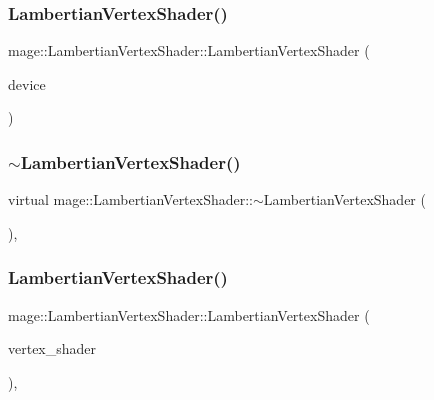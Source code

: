 \subsubsection{\texorpdfstring{Lambertian\+Vertex\+Shader()}{LambertianVertexShader()}\hspace{0.1cm}{\footnotesize\ttfamily [1/3]}}
{\footnotesize\ttfamily mage\+::\+Lambertian\+Vertex\+Shader\+::\+Lambertian\+Vertex\+Shader (\begin{DoxyParamCaption}\item[{I\+D3\+D11\+Device2 \&}]{device }\end{DoxyParamCaption})}

\hypertarget{classmage_1_1_lambertian_vertex_shader_a55636fd3817b97b6529690d6e3e5cd46}{}\label{classmage_1_1_lambertian_vertex_shader_a55636fd3817b97b6529690d6e3e5cd46} 
\subsubsection{\texorpdfstring{$\sim$\+Lambertian\+Vertex\+Shader()}{~LambertianVertexShader()}}
{\footnotesize\ttfamily virtual mage\+::\+Lambertian\+Vertex\+Shader\+::$\sim$\+Lambertian\+Vertex\+Shader (\begin{DoxyParamCaption}{ }\end{DoxyParamCaption})\hspace{0.3cm}{\ttfamily [virtual]}, {\ttfamily [default]}}

\hypertarget{classmage_1_1_lambertian_vertex_shader_add164d66906e307d95232b2c41567a21}{}\label{classmage_1_1_lambertian_vertex_shader_add164d66906e307d95232b2c41567a21} 
\subsubsection{\texorpdfstring{Lambertian\+Vertex\+Shader()}{LambertianVertexShader()}\hspace{0.1cm}{\footnotesize\ttfamily [2/3]}}
{\footnotesize\ttfamily mage\+::\+Lambertian\+Vertex\+Shader\+::\+Lambertian\+Vertex\+Shader (\begin{DoxyParamCaption}\item[{const \hyperlink{classmage_1_1_lambertian_vertex_shader}{Lambertian\+Vertex\+Shader} \&}]{vertex\+\_\+shader }\end{DoxyParamCaption})\hspace{0.3cm}{\ttfamily [private]}, {\ttfamily [delete]}}

